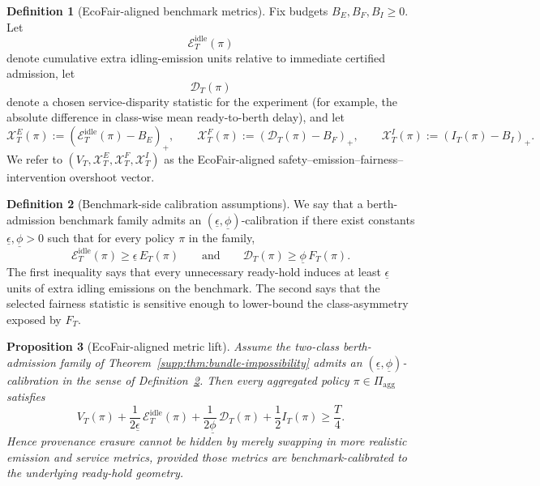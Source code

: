\documentclass[11pt]{article}
\newcommand{\1}{\mathbf{1}}
\theoremstyle{definition}
\newtheorem{definition}{Definition}[section]
\theoremstyle{plain}
\newtheorem{proposition}[definition]{Proposition}
\theoremstyle{remark}
\begin{document}
\begin{definition}[EcoFair-aligned benchmark metrics]
\label{supp:def:actual-metrics}
Fix budgets $B_E,B_F,B_I\ge 0$. Let
\[
\mathcal E_T^{\mathrm{idle}}(\pi)
\]
denote cumulative extra idling-emission units relative to immediate certified admission, let
\[
\mathcal D_T(\pi)
\]
denote a chosen service-disparity statistic for the experiment (for example, the absolute difference in class-wise mean ready-to-berth delay), and let
\[
\mathcal X_T^{E}(\pi):=(\mathcal E_T^{\mathrm{idle}}(\pi)-B_E)_+,
\qquad
\mathcal X_T^{F}(\pi):=(\mathcal D_T(\pi)-B_F)_+,
\qquad
\mathcal X_T^{I}(\pi):=(I_T(\pi)-B_I)_+.
\]
We refer to $(V_T,\mathcal X_T^{E},\mathcal X_T^{F},\mathcal X_T^{I})$ as the EcoFair-aligned safety--emission--fairness--intervention overshoot vector.
\end{definition}

\begin{definition}[Benchmark-side calibration assumptions]
\label{supp:def:calibration}
We say that a berth-admission benchmark family admits an $(\underline\epsilon,\underline\phi)$-calibration if there exist constants $\underline\epsilon,\underline\phi>0$ such that for every policy $\pi$ in the family,
\[
\mathcal E_T^{\mathrm{idle}}(\pi)\ge \underline\epsilon\, E_T(\pi)
\qquad\text{and}\qquad
\mathcal D_T(\pi)\ge \underline\phi\, F_T(\pi).
\]
The first inequality says that every unnecessary ready-hold induces at least $\underline\epsilon$ units of extra idling emissions on the benchmark. The second says that the selected fairness statistic is sensitive enough to lower-bound the class-asymmetry exposed by $F_T$.
\end{definition}

\begin{proposition}[EcoFair-aligned metric lift]
\label{supp:prop:budget-lift}
Assume the two-class berth-admission family of Theorem~\ref{supp:thm:bundle-impossibility} admits an $(\underline\epsilon,\underline\phi)$-calibration in the sense of Definition~\ref{supp:def:calibration}. Then every aggregated policy $\pi\in\Pi_{\mathrm{agg}}$ satisfies
\[
V_T(\pi)
+ \frac{1}{2\underline\epsilon}\,\mathcal E_T^{\mathrm{idle}}(\pi)
+ \frac{1}{2\underline\phi}\,\mathcal D_T(\pi)
+ \frac{1}{2} I_T(\pi)
\ge \frac{T}{4}.
\]
Hence provenance erasure cannot be hidden by merely swapping in more realistic emission and service metrics, provided those metrics are benchmark-calibrated to the underlying ready-hold geometry.
\end{proposition}
\end{document}
